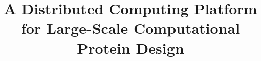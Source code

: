 \documentclass{article}
\begin{document}
\begin{spacing}{2.0}

\title{\huge \bf A Distributed Computing Platform for Large-Scale Computational Protein Design}
\date{}
\author{}

\maketitle

















\end{spacing}
\end{document}
